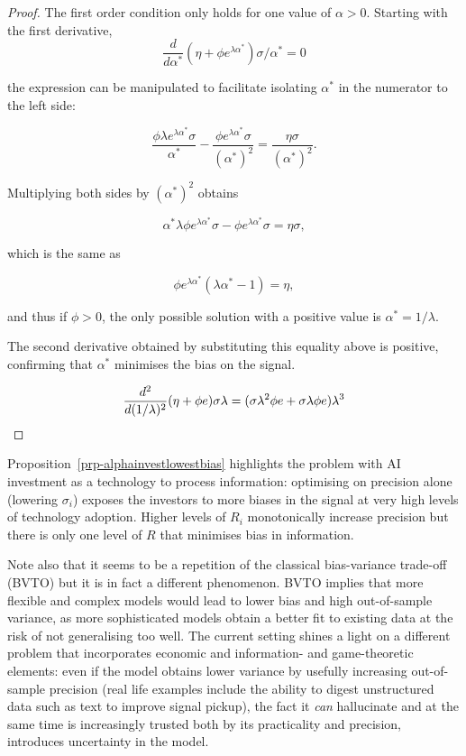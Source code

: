 \documentclass[
]{article}
\theoremstyle{plain}
\theoremstyle{definition}
\theoremstyle{remark}
\begin{document}
\begin{proof}
The first order condition only holds for one value of \(\alpha > 0\).
Starting with the first derivative, \[
\frac{d}{d \alpha^*} (\eta + \phi e^{\lambda \alpha^*}) \sigma / \alpha^* = 0
\]

the expression can be manipulated to facilitate isolating \(\alpha^*\)
in the numerator to the left side:

\[
\frac{\phi \lambda e^{\lambda \alpha^*} \sigma}{\alpha^*} - \frac{\phi e^{\lambda \alpha^*}\sigma}{(\alpha^*)^2} = \frac{\eta \sigma}{(\alpha^*)^2}.
\]

Multiplying both sides by \((\alpha^*)^2\) obtains

\[
\alpha^* \lambda \phi e^{\lambda \alpha^*} \sigma - \phi e^{\lambda \alpha^*}\sigma = \eta \sigma,
\]

which is the same as

\[
\phi e^{\lambda \alpha^*} (\lambda \alpha^* - 1)= \eta,
\]

and thus if \(\phi > 0\), the only possible solution with a positive
value is \(\alpha^* = 1/\lambda\).

The second derivative obtained by substituting this equality above is
positive, confirming that \(\alpha^*\) minimises the bias on the signal.

\[
\frac{d^2}{d (1/\lambda)^2} (\eta + \phi e) \sigma \lambda = (\sigma \lambda^2 \phi e + \sigma \lambda \phi e)\lambda^3 \\
\]
\end{proof}

Proposition~\ref{prp-alphainvestlowestbias} highlights the problem with
AI investment as a technology to process information: optimising on
precision alone (lowering \(\sigma_i\)) exposes the investors to more
biases in the signal at very high levels of technology adoption. Higher
levels of \(R_i\) monotonically increase precision but there is only one
level of \(R\) that minimises bias in information.

Note also that it seems to be a repetition of the classical
bias-variance trade-off (BVTO) but it is in fact a different phenomenon.
BVTO implies that more flexible and complex models would lead to lower
bias and high out-of-sample variance, as more sophisticated models
obtain a better fit to existing data at the risk of not generalising too
well. The current setting shines a light on a different problem that
incorporates economic and information- and game-theoretic elements: even
if the model obtains lower variance by usefully increasing out-of-sample
precision (real life examples include the ability to digest unstructured
data such as text to improve signal pickup), the fact it \emph{can}
hallucinate and at the same time is increasingly trusted both by its
practicality and precision, introduces uncertainty in the model.
\end{document}

